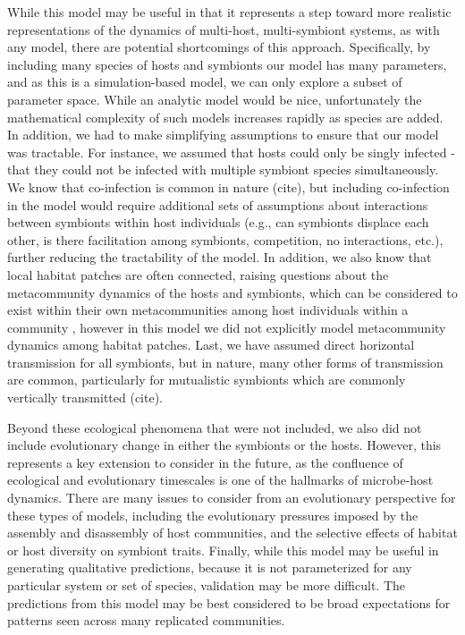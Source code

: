 \documentclass[12pt]{article}
\begin{document}
While this model may be useful in that it represents a step toward more realistic representations of the dynamics of multi-host, multi-symbiont systems, as with any model, there are potential shortcomings of this approach. 
Specifically, by including many species of hosts and symbionts our model has many parameters, and as this is a simulation-based model, we can only explore a subset of parameter space. 
While an analytic model would be nice, unfortunately the mathematical complexity of such models increases rapidly as species are added. 
In addition, we had to make simplifying assumptions to ensure that our model was tractable. 
For instance, we assumed that hosts could only be singly infected - that they could not be infected with multiple symbiont species simultaneously. 
We know that co-infection is common in nature (cite), but including co-infection in the model would require additional sets of assumptions about interactions between symbionts within host individuals (e.g., can symbionts displace each other, is there facilitation among symbionts, competition, no interactions, etc.), further reducing the tractability of the model. 
In addition, we also know that local habitat patches are often connected, raising questions about the metacommunity dynamics of the hosts and symbionts, which can be considered to exist within their own metacommunities among host individuals within a community \citep{Mihaljevic2012}, however in this model we did not explicitly model metacommunity dynamics among habitat patches.
Last, we have assumed direct horizontal transmission for all symbionts, but in nature, many other forms of transmission are common, particularly for mutualistic symbionts which are commonly vertically transmitted (cite). 

Beyond these ecological phenomena that were not included, we also did not include evolutionary change in either the symbionts or the hosts. 
However, this represents a key extension to consider in the future, as the confluence of ecological and evolutionary timescales is one of the hallmarks of microbe-host dynamics. 
There are many issues to consider from an evolutionary perspective for these types of models, including the evolutionary pressures imposed by the assembly and disassembly of host communities, and the selective effects of habitat or host diversity on symbiont traits. 
Finally, while this model may be useful in generating qualitative predictions, because it is not parameterized for any particular system or set of species, validation may be more difficult. 
The predictions from this model may be best considered to be broad expectations for patterns seen across many replicated communities. 
\end{document}
